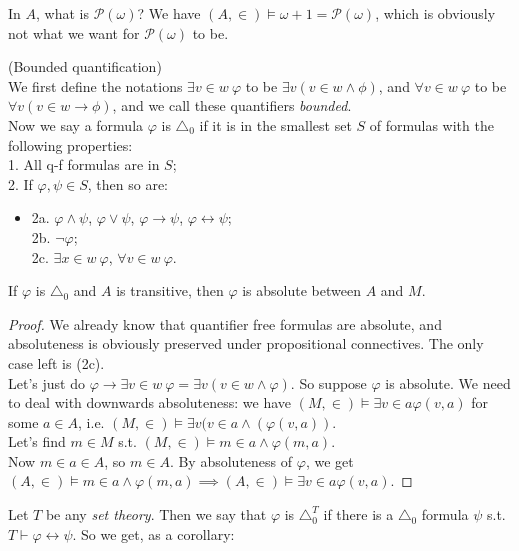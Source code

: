 \documentclass[a4paper]{article}
\begin{document}
In $A$, what is $\mathcal{P}(\omega)$? We have $(A,\in) \vDash \omega+1 = \mathcal{P}(\omega)$, which is obviously not what we want for $\mathcal{P}(\omega)$ to be.

\begin{defi} (Bounded quantification)\\
We first define the notations $\exists v \in w\ \varphi$ to be $\exists v (v \in w \wedge \phi)$, and $\forall v \in w\ \varphi$ to be $\forall v (v \in w \to \phi)$, and we call these quantifiers \emph{bounded}.\\
Now we say a formula $\varphi$ is $\triangle_0$ if it is in the smallest set $S$ of formulas with the following properties:\\
1. All q-f formulas are in $S$;\\
2. If $\varphi,\psi \in S$, then so are:
\begin{itemize}
\item[] 2a. $\varphi \wedge \psi$, $\varphi \vee \psi$, $\varphi \to \psi$, $\varphi \leftrightarrow \psi$;\\
2b. $\neg \varphi$;\\
2c. $\exists x \in w\ \varphi$, $\forall v \in w\ \varphi$.
\end{itemize}
\end{defi}

\begin{thm}
If $\varphi$ is $\triangle_0$ and $A$ is transitive, then $\varphi$ is absolute between $A$ and $M$.
\begin{proof}
We already know that quantifier free formulas are absolute, and absoluteness is obviously preserved under propositional connectives. The only case left is (2c).\\
Let's just do $\varphi \to \exists v \in w\ \varphi = \exists v (v \in w \wedge \varphi)$. So suppose $\varphi$ is absolute. We need to deal with downwards absoluteness: we have $(M,\in) \vDash \exists v \in a \varphi(v,a)$ for some $a \in A$, i.e. $(M,\in) \vDash \exists v (v \in a \wedge (\varphi(v,a))$.\\
Let's find $m \in M$ s.t. $(M,\in) \vDash m \in a \wedge \varphi(m,a)$.\\
Now $m\in a\in A$, so $m \in A$. By absoluteness of $\varphi$, we get $(A,\in) \vDash m \in a \wedge \varphi(m,a) \implies (A,\in) \vDash \exists v \in a \varphi(v,a)$.
\end{proof}
\end{thm}

Let $T$ be any \emph{set theory}. Then we say that $\varphi$ is $\triangle_0^T$ if there is a $\triangle_0$ formula $\psi$ s.t. $T \vdash \varphi \leftrightarrow \psi$. So we get, as a corollary:
\end{document}
